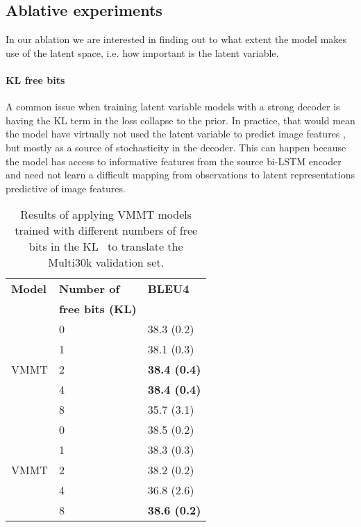 \documentclass[11pt,a4paper]{article}
\newcommand{\cond}{VMMT\xspace}
\newcommand{\uncond}{VMMT\xspace}
\begin{document}
\subsection{Ablative experiments}
In our ablation we are interested in finding out to what extent the model makes use of the latent space, i.e. how important is the latent variable.



\paragraph{KL free bits}


A common issue when training latent variable models with a strong decoder is having the KL term in the loss collapse to the prior.
In practice, that would mean the model have virtually not used the latent variable  to predict image features , but mostly as a source of stochasticity in the decoder.
This can happen because the model has access to informative features from the source bi-LSTM encoder and need not learn a difficult mapping from observations to latent representations predictive of image features.


\begin{table}[t!]
\centering
\begin{tabular}{lll}
\toprule
{\bf Model} & {\bf Number of} & \bf BLEU4 \\
			& {\bf free bits (KL)} &				\\
\midrule

\multirow{5}{*}{\uncond}	& 0 & 38.3 (0.2)  \\
									& 1 & 38.1 (0.3)  \\
									& 2 & {\bf 38.4 (0.4) }  \\
									& 4 & {\bf 38.4 (0.4) }  \\
									& 8 & 35.7 (3.1)  \\
\midrule
\multirow{5}{*}{\cond}	& 0 & 38.5 (0.2)  \\
									& 1 & 38.3 (0.3)  \\
									& 2 & 38.2 (0.2)  \\
									& 4 & 36.8 (2.6)  \\
									& 8 & {\bf 38.6 (0.2) } \\

\bottomrule
\end{tabular}
\caption{Results of applying VMMT models trained with different numbers of free bits in the KL~\citep{Kingmaetal2016} to translate the Multi30k validation set.}
\label{tab:kl_free_bits}
\end{table}
\end{document}
